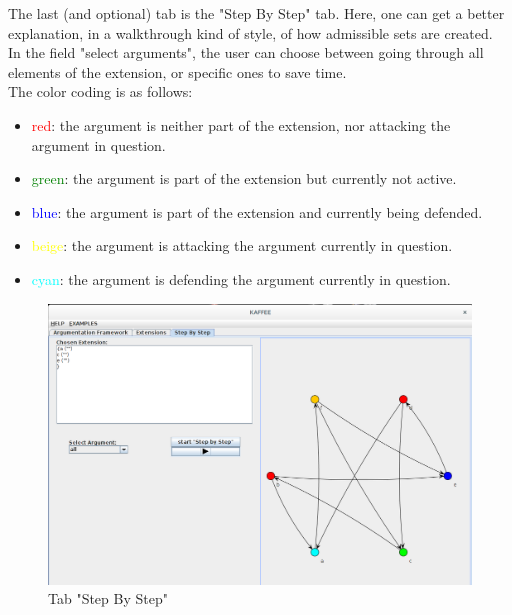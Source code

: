 \documentclass[12pt]{report}
\numberwithin{figure}{chapter}
\theoremstyle{break}
\begin{document}
\newpage

The last (and optional) tab is the "Step By Step" tab. Here, one can get a better explanation, in a walkthrough kind of style, of how admissible sets are created.\\
In the field "select arguments", the user can choose between going through all elements of the extension, or specific ones to save time.\\
The color coding is as follows:
\begin{itemize}
	\item{\textcolor{red}{red}: the argument is neither part of the extension, nor attacking the argument in question.}
	\item{\textcolor{green}{green}: the argument is part of the extension but currently not active.}
	\item{\textcolor{blue}{blue}: the argument is part of the extension and currently being defended.}
	\item{\textcolor{yellow}{beige}: the argument is attacking the argument currently in question.}
	\item{\textcolor{cyan}{cyan}: the argument is defending the argument currently in question.}
\end{itemize}
 
\bigskip
\begin{figure}[h!]
	\begin{center}\includegraphics[scale=0.35]{Images/Screenshot_KAFFEE_Tab3.png}
	\end{center}
\caption{Tab "Step By Step"}
\end{figure}
\end{document}
